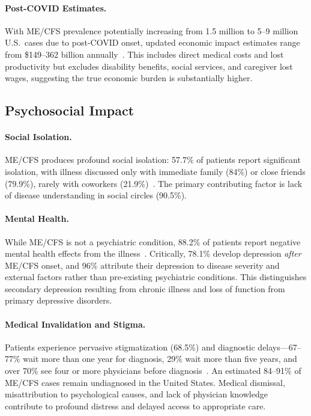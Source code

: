 \paragraph{Post-COVID Estimates.}
With ME/CFS prevalence potentially increasing from 1.5 million to 5--9 million U.S.\ cases due to post-COVID onset, updated economic impact estimates range from \$149--362 billion annually~\cite{Jason2022prevalence}. This includes direct medical costs and lost productivity but excludes disability benefits, social services, and caregiver lost wages, suggesting the true economic burden is substantially higher.

\subsection{Psychosocial Impact}
\label{subsec:psychosocial}

\paragraph{Social Isolation.}
ME/CFS produces profound social isolation: 57.7\% of patients report significant isolation, with illness discussed only with immediate family (84\%) or close friends (79.9\%), rarely with coworkers (21.9\%)~\cite{Konig2024mental}. The primary contributing factor is lack of disease understanding in social circles (90.5\%).

\paragraph{Mental Health.}
While ME/CFS is not a psychiatric condition, 88.2\% of patients report negative mental health effects from the illness~\cite{Konig2024mental}. Critically, 78.1\% develop depression \emph{after} ME/CFS onset, and 96\% attribute their depression to disease severity and external factors rather than pre-existing psychiatric conditions. This distinguishes secondary depression resulting from chronic illness and loss of function from primary depressive disorders.

\paragraph{Medical Invalidation and Stigma.}
Patients experience pervasive stigmatization (68.5\%) and diagnostic delays---67--77\% wait more than one year for diagnosis, 29\% wait more than five years, and over 70\% see four or more physicians before diagnosis~\cite{IOM2015}. An estimated 84--91\% of ME/CFS cases remain undiagnosed in the United States. Medical dismissal, misattribution to psychological causes, and lack of physician knowledge contribute to profound distress and delayed access to appropriate care.

